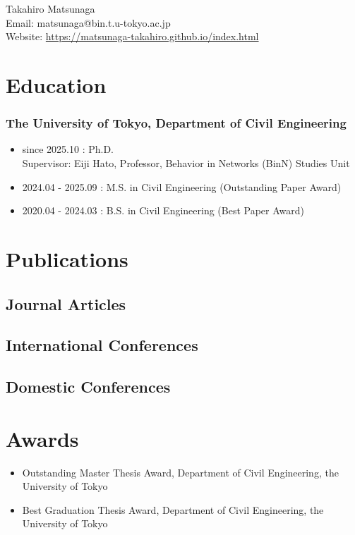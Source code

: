 \documentclass[uplatex,a4paper,10pt,dvipdfmx]{jsarticle}
\begin{document}
\begin{center}
  {\LARGE Takahiro Matsunaga}\\[2mm] %
  \small Email: {matsunaga@bin.t.u-tokyo.ac.jp} \\ Website: \url{https://matsunaga-takahiro.github.io/index.html}
\end{center}

\section*{Education}
\subsubsection*{The University of Tokyo, Department of Civil Engineering}
\begin{itemize}
  \item since 2025.10 : Ph.D. \\
        Supervisor: Eiji Hato, Professor, Behavior in Networks (BinN) Studies Unit
  \item 2024.04 - 2025.09 : M.S. in Civil Engineering (Outstanding Paper Award)
  \item 2020.04 - 2024.03 : B.S. in Civil Engineering (Best Paper Award)

\end{itemize}


\section*{Publications}

\nocite{*}

\subsection*{Journal Articles}
\printbibliography[filter=journal,heading=none]

\subsection*{International Conferences}
\printbibliography[filter=conf-intl,heading=none]

\subsection*{Domestic Conferences}

\section*{Awards}
\begin{itemize}
  \item Outstanding Master Thesis Award,  Department of Civil Engineering, the University of Tokyo
  \item Best Graduation Thesis Award, Department of Civil Engineering, the University of Tokyo
\end{itemize}

\printbibliography[filter=conf-dom,heading=none]
\end{document}
